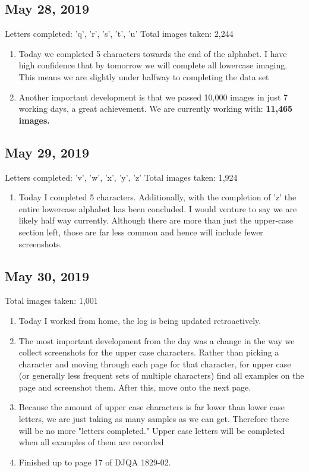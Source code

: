 \documentclass[12pt]{article} %
\begin{document}
\subsection{May 28, 2019}
Letters completed: 'q', 'r', 's', 't', 'u'\newline
Total images taken: 2,244 \newline
\noindent\makebox[\linewidth]{\rule{15cm}{0.4pt}}
\begin{enumerate}[label = (\roman*)]
\item Today we completed 5 characters towards the end of the alphabet. I have high confidence that by tomorrow we will complete all lowercase imaging. This means we are slightly under halfway to completing the data set
\item Another important development is that we passed 10,000 images in just 7 working days, a great achievement. We are currently working with: \bf{11,465} images.
\end{enumerate}

\subsection{May 29, 2019}
Letters completed: 'v', 'w', 'x', 'y', 'z'\newline
Total images taken: 1,924 \newline
\noindent\makebox[\linewidth]{\rule{15cm}{0.4pt}}
\begin{enumerate}[label = (\roman*)]
\item Today I completed 5 characters. Additionally, with the completion of 'z' the entire lowercase alphabet has been concluded. I would venture to say we are likely half way currently. Although there are more than just the upper-case section left, those are far less common and hence will include fewer screenshots.
\end{enumerate}

\subsection{May 30, 2019}
Total images taken: 1,001\newline
\noindent\makebox[\linewidth]{\rule{15cm}{0.4pt}}
\begin{enumerate}[label = (\roman*)]
\item Today I worked from home, the log is being updated retroactively.
\item The most important development from the day was a change in the way we collect screenshots for the upper case characters. Rather than picking a character and moving through each page for that character, for upper case (or generally less frequent sets of multiple characters) find all examples on the page and screenshot them. After this, move onto the next page.
\item Because the amount of upper case characters is far lower than lower case letters, we are just taking as many samples as we can get. Therefore there will be no more "letters completed." Upper case letters will be completed when all examples of them are recorded
\item Finished up to page 17 of DJQA 1829-02.
\end{enumerate}
\end{document}

